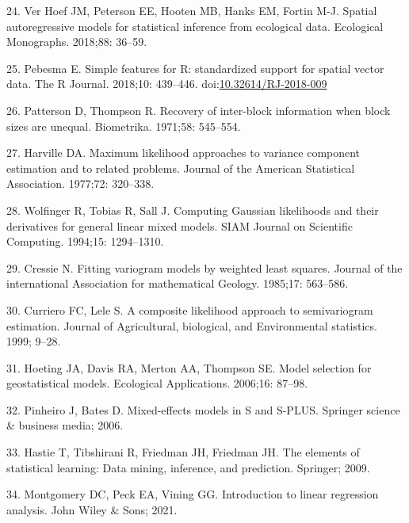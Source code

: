 \documentclass[10pt,letterpaper]{article}
\begin{document}
\leavevmode\hypertarget{ref-ver2018spatial}{}%
24. Ver Hoef JM, Peterson EE, Hooten MB, Hanks EM, Fortin M-J. Spatial
autoregressive models for statistical inference from ecological data.
Ecological Monographs. 2018;88: 36--59.

\leavevmode\hypertarget{ref-pebesma2018sf}{}%
25. Pebesma E. Simple features for R: standardized support for spatial
vector data. The R Journal. 2018;10: 439--446.
doi:\href{https://doi.org/10.32614/RJ-2018-009}{10.32614/RJ-2018-009}

\leavevmode\hypertarget{ref-patterson1971recovery}{}%
26. Patterson D, Thompson R. Recovery of inter-block information when
block sizes are unequal. Biometrika. 1971;58: 545--554.

\leavevmode\hypertarget{ref-harville1977maximum}{}%
27. Harville DA. Maximum likelihood approaches to variance component
estimation and to related problems. Journal of the American Statistical
Association. 1977;72: 320--338.

\leavevmode\hypertarget{ref-wolfinger1994computing}{}%
28. Wolfinger R, Tobias R, Sall J. Computing Gaussian likelihoods and
their derivatives for general linear mixed models. SIAM Journal on
Scientific Computing. 1994;15: 1294--1310.

\leavevmode\hypertarget{ref-cressie1985fitting}{}%
29. Cressie N. Fitting variogram models by weighted least squares.
Journal of the international Association for mathematical Geology.
1985;17: 563--586.

\leavevmode\hypertarget{ref-curriero1999composite}{}%
30. Curriero FC, Lele S. A composite likelihood approach to
semivariogram estimation. Journal of Agricultural, biological, and
Environmental statistics. 1999; 9--28.

\leavevmode\hypertarget{ref-hoeting2006model}{}%
31. Hoeting JA, Davis RA, Merton AA, Thompson SE. Model selection for
geostatistical models. Ecological Applications. 2006;16: 87--98.

\leavevmode\hypertarget{ref-pinheiro2006mixed}{}%
32. Pinheiro J, Bates D. Mixed-effects models in S and S-PLUS. Springer
science \& business media; 2006.

\leavevmode\hypertarget{ref-hastie2009elements}{}%
33. Hastie T, Tibshirani R, Friedman JH, Friedman JH. The elements of
statistical learning: Data mining, inference, and prediction. Springer;
2009.

\leavevmode\hypertarget{ref-montgomery2021introduction}{}%
34. Montgomery DC, Peck EA, Vining GG. Introduction to linear regression
analysis. John Wiley \& Sons; 2021.
\end{document}
